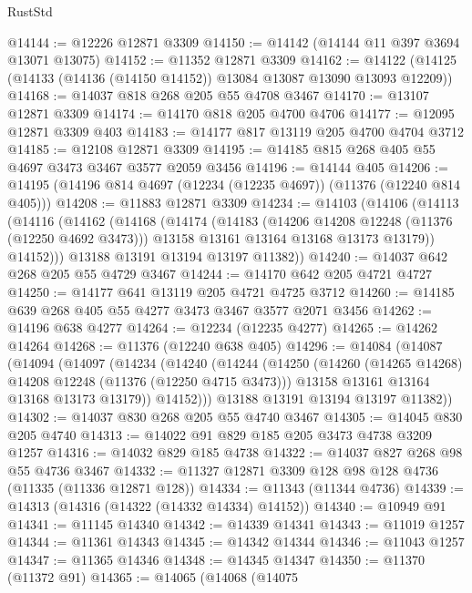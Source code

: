 \begin{lexlean}{RustStd}
\begin{coremodule}
{\begin{coremodule}
{{{{{{{{{{{{{{{{{{{{{{{{{{{{{{{{{{{{{{{{{{{{{{{{{{{{{{{{{{{{{{{{{{{{{{{{{{{{{{{{{{{{{@14144 := @12226 @12871 @3309
@14150 := @14142 (@14144 @11 @397 @3694 @13071 @13075)
@14152 := @11352 @12871 @3309
@14162 := @14122 (@14125 (@14133 (@14136 (@14150 @14152)) @13084 @13087 @13090 @13093 @12209))
@14168 := @14037 @818 @268 @205 @55 @4708 @3467
@14170 := @13107 @12871 @3309
@14174 := @14170 @818 @205 @4700 @4706
@14177 := @12095 @12871 @3309 @403
@14183 := @14177 @817 @13119 @205 @4700 @4704 @3712
@14185 := @12108 @12871 @3309
@14195 := @14185 @815 @268 @405 @55 @4697 @3473 @3467 @3577 @2059 @3456
@14196 := @14144 @405
@14206 := @14195 (@14196 @814 @4697 (@12234 (@12235 @4697)) (@11376 (@12240 @814 @405)))
@14208 := @11883 @12871 @3309
@14234 := @14103
    (@14106
      (@14113
        (@14116
          (@14162
            (@14168
              (@14174
                (@14183
                  (@14206 @14208 @12248 (@11376 (@12250 @4692 @3473)))
                  @13158
                  @13161
                  @13164
                  @13168
                  @13173
                  @13179))
              @14152)))
        @13188
        @13191
        @13194
        @13197
        @11382))
@14240 := @14037 @642 @268 @205 @55 @4729 @3467
@14244 := @14170 @642 @205 @4721 @4727
@14250 := @14177 @641 @13119 @205 @4721 @4725 @3712
@14260 := @14185 @639 @268 @405 @55 @4277 @3473 @3467 @3577 @2071 @3456
@14262 := @14196 @638 @4277
@14264 := @12234 (@12235 @4277)
@14265 := @14262 @14264
@14268 := @11376 (@12240 @638 @405)
@14296 := @14084
    (@14087
      (@14094
        (@14097
          (@14234
            (@14240
              (@14244
                (@14250
                  (@14260 (@14265 @14268) @14208 @12248 (@11376 (@12250 @4715 @3473)))
                  @13158
                  @13161
                  @13164
                  @13168
                  @13173
                  @13179))
              @14152)))
        @13188
        @13191
        @13194
        @13197
        @11382))
@14302 := @14037 @830 @268 @205 @55 @4740 @3467
@14305 := @14045 @830 @205 @4740
@14313 := @14022 @91 @829 @185 @205 @3473 @4738 @3209 @1257
@14316 := @14032 @829 @185 @4738
@14322 := @14037 @827 @268 @98 @55 @4736 @3467
@14332 := @11327 @12871 @3309 @128 @98 @128 @4736 (@11335 (@11336 @12871 @128))
@14334 := @11343 (@11344 @4736)
@14339 := @14313 (@14316 (@14322 (@14332 @14334) @14152))
@14340 := @10949 @91
@14341 := @11145 @14340
@14342 := @14339 @14341
@14343 := @11019 @1257
@14344 := @11361 @14343
@14345 := @14342 @14344
@14346 := @11043 @1257
@14347 := @11365 @14346
@14348 := @14345 @14347
@14350 := @11370 (@11372 @91)
@14365 := @14065
    (@14068
      (@14075
}}}}}}}}}}}}}}}}}}}}}}}}}}}}}}}}}}}}}}}}}}}}}}}}}}}}}}}}}}}}}}}}}}}}}}}}}}}}}}}}}}}}}
\end{coremodule}}
\end{coremodule}
\end{lexlean}
